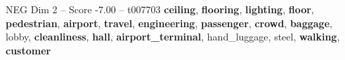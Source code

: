 \begin{textsample}{NEG Dim 2 – Score -7.00 – t007703}  \label{ex:f2_neg_002}
\textbf{ceiling}, \textbf{flooring}, \textbf{lighting}, \textbf{floor}, \textbf{pedestrian}, \textbf{airport}, \textbf{travel}, \textbf{engineering}, \textbf{passenger}, \textbf{crowd}, \textbf{baggage}, lobby, \textbf{cleanliness}, \textbf{hall}, \textbf{airport\_terminal}, hand\_luggage, steel, \textbf{walking}, \textbf{customer}

\end{textsample}
